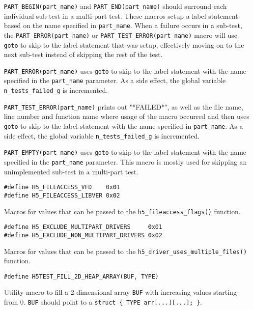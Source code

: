 \documentclass[../HDF5_RFC.tex]{subfiles}
\begin{document}
\texttt{PART\_BEGIN(part\_name)} and \texttt{PART\_END(part\_name)} should surround each individual
sub-test in a multi-part test. These macros setup a label statement based on the name specified in
\texttt{part\_name}. When a failure occurs in a sub-test, the \texttt{PART\_ERROR(part\_name)} or
\texttt{PART\_TEST\_ERROR(part\_name)} macro will use \texttt{goto} to skip to the label statement
that was setup, effectively moving on to the next sub-test instead of skipping the rest of the test.

\texttt{PART\_ERROR(part\_name)} uses \texttt{goto} to skip to the label statement with the name
specified in the \texttt{part\_name} parameter. As a side effect, the global variable \texttt{n\_tests\_failed\_g}
is incremented.

\texttt{PART\_TEST\_ERROR(part\_name)} prints out "*FAILED*", as well as the file name, line number and function name where usage of the macro occurred and then uses \texttt{goto} to skip to the label statement with the name specified in \texttt{part\_name}. As a side effect, the global variable
\texttt{n\_tests\_failed\_g} is incremented.

\texttt{PART\_EMPTY(part\_name)} uses \texttt{goto} to skip to the label statement with the name specified
in the \texttt{part\_name} parameter. This macro is mostly used for skipping an unimplemented sub-test in a multi-part test.

\begin{verbatim}
#define H5_FILEACCESS_VFD    0x01
#define H5_FILEACCESS_LIBVER 0x02
\end{verbatim}

Macros for values that can be passed to the \texttt{h5\_fileaccess\_flags()} function.

\begin{verbatim}
#define H5_EXCLUDE_MULTIPART_DRIVERS     0x01
#define H5_EXCLUDE_NON_MULTIPART_DRIVERS 0x02
\end{verbatim}

Macros for values that can be passed to the \texttt{h5\_driver\_uses\_multiple\_files()} function.

\begin{verbatim}
#define H5TEST_FILL_2D_HEAP_ARRAY(BUF, TYPE)
\end{verbatim}

Utility macro to fill a 2-dimensional array \texttt{BUF} with increasing values starting from 0.
\texttt{BUF} should point to a \texttt{struct \{ TYPE arr[...][...]; \}}.
\end{document}

